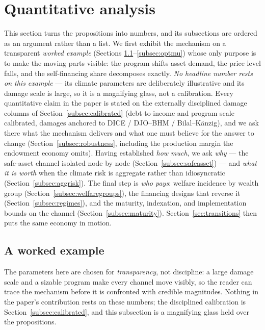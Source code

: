 \documentclass[12pt]{article}
\makeatletter
\newcommand{\FloatBarrier}{\par
    \begingroup\let\@elt\relax
    \edef\reserved@a{\@deferlist}\endgroup
    \ifx\reserved@a\@empty\else\clearpage\fi}
\makeatother
\begin{document}
\FloatBarrier
\section{Quantitative analysis}\label{sec:quant}

This section turns the propositions into numbers, and its subsections are
ordered as an argument rather than a list. We first exhibit the
mechanism on a transparent \emph{worked example} (Sections
\ref{subsec:calibration}--\ref{subsec:optmu}) whose only purpose is to make
the moving parts visible: the program shifts asset
demand, the price level falls, and the self-financing share decomposes
exactly. \emph{No headline number rests on this example} --- its climate
parameters are deliberately illustrative and its damage scale is large, so
it is a magnifying glass, not a calibration. Every quantitative claim in the
paper is stated on the externally disciplined damage columns of
Section~\ref{subsec:calibrated} (debt-to-income and program scale calibrated,
damages anchored to DICE / DJO--BHM / Bilal--K\"anzig), and we ask there
what the mechanism delivers and what one must believe for the answer
to change (Section~\ref{subsec:robustness}, including the production
margin the endowment economy omits). Having established \emph{how much},
we ask \emph{why} --- the safe-asset channel isolated node by node
(Section~\ref{subsec:safeasset}) --- and \emph{what it is worth} when the
climate risk is aggregate rather than idiosyncratic
(Section~\ref{subsec:aggrisk}). The final step is \emph{who pays}: welfare
incidence by wealth group (Section~\ref{subsec:welfaregroups}), the
financing designs that reverse it (Section~\ref{subsec:regimes}), and the
maturity, indexation, and implementation bounds on the channel
(Section~\ref{subsec:maturity}). Section~\ref{sec:transitions} then puts
the same economy in motion.

\subsection{A worked example}\label{subsec:calibration}

The parameters here are chosen for \emph{transparency}, not discipline: a
large damage scale and a sizable program make every channel move visibly, so
the reader can trace the mechanism before it is confronted with credible
magnitudes. Nothing in the paper's contribution rests on these numbers; the
disciplined calibration is Section~\ref{subsec:calibrated}, and this
subsection is a magnifying glass held over the propositions.
\end{document}
